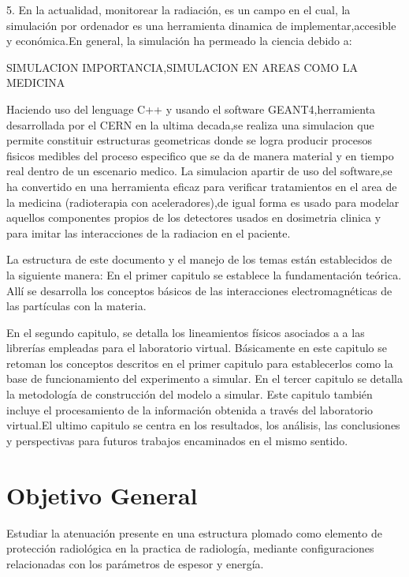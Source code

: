\documentclass[12pt,fleqn]{book} %
\numberwithin{equation}{section} %
\numberwithin{figure}{section} %
\numberwithin{table}{section} %
\begin{document}
5.
En la actualidad, monitorear la radiación, es un campo en el cual, la simulación por ordenador es una herramienta dinamica de implementar,accesible y económica.En general, la simulación ha permeado la ciencia debido a:  


SIMULACION IMPORTANCIA,SIMULACION EN AREAS COMO LA MEDICINA

Haciendo uso del lenguage C++ y usando el software GEANT4,herramienta desarrollada  por el CERN en la ultima decada,se realiza una simulacion que permite constituir estructuras  geometricas donde se logra producir procesos fisicos medibles del proceso especifico que se da de manera material y en tiempo real dentro de un escenario medico. 
La simulacion apartir de uso del software,se ha convertido en una herramienta eficaz para verificar tratamientos en el area de la medicina (radioterapia con aceleradores),de igual forma es usado para modelar aquellos componentes propios de los detectores usados en dosimetria clinica y para imitar las interacciones de la radiacion en el paciente.




La estructura de este documento y el manejo  de los temas están establecidos de la siguiente manera: En el primer capitulo se establece la fundamentación teórica. Allí se desarrolla los conceptos básicos de las interacciones electromagnéticas de las partículas con la materia.

 En el segundo capitulo, se detalla los lineamientos físicos asociados a a las librerías empleadas para el laboratorio virtual. Básicamente en este capitulo se retoman los conceptos descritos en el  primer capitulo para establecerlos como la base de funcionamiento del experimento a simular. En el tercer capitulo se detalla la metodología de construcción del modelo a simular. Este capitulo también incluye el procesamiento de la información obtenida a través del laboratorio virtual.El ultimo capitulo se centra en los resultados, los análisis, las conclusiones y perspectivas para futuros trabajos encaminados en el mismo sentido.










\section{Objetivo General}
Estudiar la atenuación presente en una estructura plomado como elemento de protección radiológica en la practica de radiología, mediante configuraciones relacionadas con los parámetros de espesor y energía.
\end{document}
